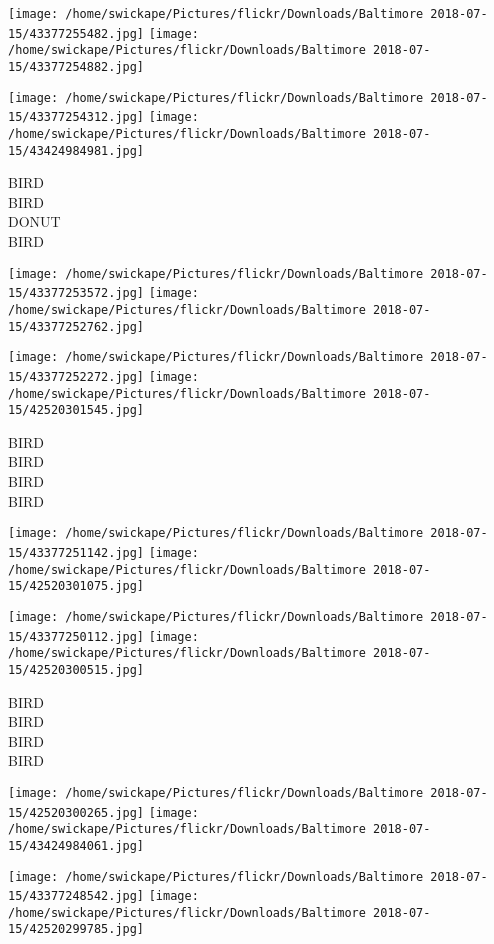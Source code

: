 \documentclass[10pt,letterpaper]{article}
\begin{document}
\texttt{[image: /home/swickape/Pictures/flickr/Downloads/Baltimore 2018-07-15/43377255482.jpg]}
\texttt{[image: /home/swickape/Pictures/flickr/Downloads/Baltimore 2018-07-15/43377254882.jpg]}

\texttt{[image: /home/swickape/Pictures/flickr/Downloads/Baltimore 2018-07-15/43377254312.jpg]}
\texttt{[image: /home/swickape/Pictures/flickr/Downloads/Baltimore 2018-07-15/43424984981.jpg]}

BIRD\\
BIRD\\
DONUT\\
BIRD\\
\pagebreak

\texttt{[image: /home/swickape/Pictures/flickr/Downloads/Baltimore 2018-07-15/43377253572.jpg]}
\texttt{[image: /home/swickape/Pictures/flickr/Downloads/Baltimore 2018-07-15/43377252762.jpg]}

\texttt{[image: /home/swickape/Pictures/flickr/Downloads/Baltimore 2018-07-15/43377252272.jpg]}
\texttt{[image: /home/swickape/Pictures/flickr/Downloads/Baltimore 2018-07-15/42520301545.jpg]}

BIRD\\
BIRD\\
BIRD\\
BIRD\\
\pagebreak

\texttt{[image: /home/swickape/Pictures/flickr/Downloads/Baltimore 2018-07-15/43377251142.jpg]}
\texttt{[image: /home/swickape/Pictures/flickr/Downloads/Baltimore 2018-07-15/42520301075.jpg]}

\texttt{[image: /home/swickape/Pictures/flickr/Downloads/Baltimore 2018-07-15/43377250112.jpg]}
\texttt{[image: /home/swickape/Pictures/flickr/Downloads/Baltimore 2018-07-15/42520300515.jpg]}

BIRD\\
BIRD\\
BIRD\\
BIRD\\
\pagebreak

\texttt{[image: /home/swickape/Pictures/flickr/Downloads/Baltimore 2018-07-15/42520300265.jpg]}
\texttt{[image: /home/swickape/Pictures/flickr/Downloads/Baltimore 2018-07-15/43424984061.jpg]}

\texttt{[image: /home/swickape/Pictures/flickr/Downloads/Baltimore 2018-07-15/43377248542.jpg]}
\texttt{[image: /home/swickape/Pictures/flickr/Downloads/Baltimore 2018-07-15/42520299785.jpg]}
\end{document}
